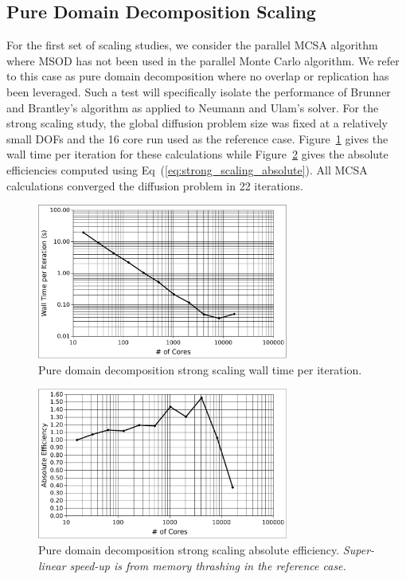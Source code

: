 \documentclass{snamc2013}
\begin{document}
\subsection{Pure Domain Decomposition Scaling}
\label{subsec:pure_domain_decomp}
For the first set of scaling studies, we consider the parallel MCSA
algorithm where MSOD has not been used in the parallel Monte Carlo
algorithm. We refer to this case as pure domain decomposition where no
overlap or replication has been leveraged. Such a test will
specifically isolate the performance of Brunner and Brantley's
algorithm as applied to Neumann and Ulam's solver. For the strong
scaling study, the global diffusion problem size was fixed at a
relatively small  DOFs and the 16 core run used as the
reference case. Figure~\ref{fig:titan_pure_strong_time} gives the wall
time per iteration for these calculations while
Figure~\ref{fig:titan_pure_strong} gives the absolute efficiencies
computed using Eq~(\ref{eq:strong_scaling_absolute}). All MCSA
calculations converged the diffusion problem in 22 iterations.

\begin{figure}[H]
  \begin{center}
    \includegraphics[width=3.25in]{titan_pure_strong_time.pdf}
  \end{center}
  \caption{Pure domain decomposition strong scaling wall time per
    iteration.}
  \label{fig:titan_pure_strong_time}
\end{figure}

\begin{figure}[H]
  \begin{center}
    \includegraphics[width=3.25in]{titan_pure_strong.pdf}
  \end{center}
  \caption{Pure domain decomposition strong scaling absolute
    efficiency. \textit{Super-linear speed-up is from memory thrashing
      in the reference case.}}
  \label{fig:titan_pure_strong}
\end{figure}
\end{document}
